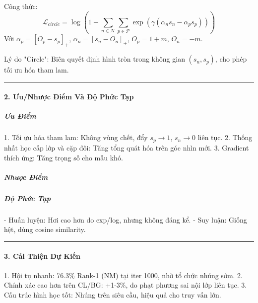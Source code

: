 Công thức:
\[
\mathcal{L}_{circle} = \log \left( 1 + \sum_{n \in \mathcal{N}} \sum_{p \in \mathcal{P}} \exp \left( \gamma (\alpha_n s_n - \alpha_p s_p) \right) \right)
\]
Với \(\alpha_p = [O_p - s_p]_+\), \(\alpha_n = [s_n - O_n]_+\), \(O_p = 1 + m\), \(O_n = -m\).

Lý do "Circle": Biên quyết định hình tròn trong không gian \((s_n, s_p)\), cho phép tối ưu hóa tham lam.

\hrule

\paragraph{2. Ưu/Nhược Điểm Và Độ Phức Tạp}

\subparagraph{Ưu Điểm}
1. Tối ưu hóa tham lam: Không vùng chết, đẩy \(s_p \to 1\), \(s_n \to 0\) liên tục.
2. Thống nhất học cấp lớp và cặp đôi: Tăng tổng quát hóa trên góc nhìn mới.
3. Gradient thích ứng: Tăng trọng số cho mẫu khó.

\subparagraph{Nhược Điểm}

\subparagraph{Độ Phức Tạp}
- Huấn luyện: Hơi cao hơn do exp/log, nhưng không đáng kể.
- Suy luận: Giống hệt, dùng cosine similarity.

\hrule

\paragraph{3. Cải Thiện Dự Kiến}
1. Hội tụ nhanh: 76.3\% Rank-1 (NM) tại iter 1000, nhờ tổ chức nhúng sớm.
2. Chính xác cao hơn trên CL/BG: +1-3\%, do phạt phương sai nội lớp liên tục.
3. Cấu trúc hình học tốt: Nhúng trên siêu cầu, hiệu quả cho truy vấn lớn.